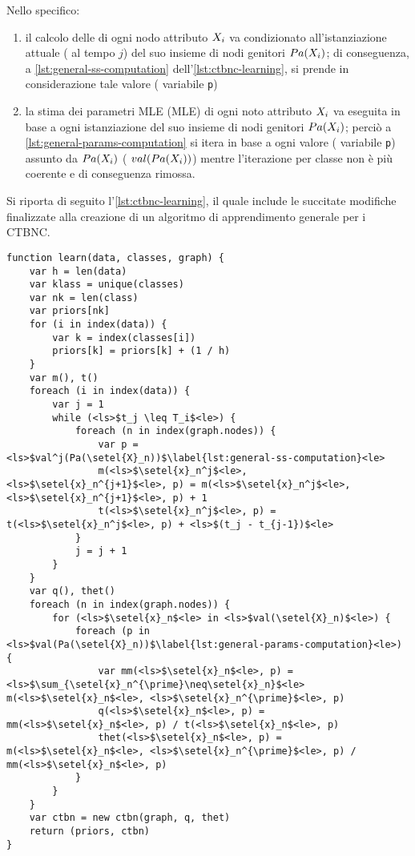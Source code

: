 Nello specifico:
\begin{enumerate}
    \item il calcolo delle \stats{} di ogni nodo attributo $\mathnormal{X}_i$ va condizionato all'istanziazione attuale (\ie{} al tempo $j$) del suo insieme di nodi genitori $Pa(\mathnormal{X}_i)$; di conseguenza, a \autoref{lst:general-ss-computation} dell'\autoref{lst:ctbnc-learning}, si prende in considerazione tale valore (\ie{} variabile \lstinline[]|p|)
    \item la stima dei parametri \acl{MLE} (\acs{MLE}) di ogni noto attributo $\mathnormal{X}_i$ va eseguita in base a ogni istanziazione del suo insieme di nodi genitori $Pa(\mathnormal{X}_i)$; perciò a \autoref{lst:general-params-computation} si itera in base a ogni valore (\ie{} variabile \lstinline[]|p|) assunto da $Pa(\mathnormal{X}_i)$ (\ie{} $val(Pa(\mathnormal{X}_i))$) mentre l'iterazione per classe non è più coerente e di conseguenza rimossa.
\end{enumerate}
Si riporta di seguito l'\autoref{lst:ctbnc-learning}, il quale include le succitate modifiche finalizzate alla creazione di un algoritmo di apprendimento generale per i \acs{CTBNC}.
\vspace*{8pt}\begin{lstlisting}[caption={[Apprendimento di un classificatore \acs{CTBN}]Apprendimento di un classificatore \acs{CTBN} (\acs{CTBNC}).}, label=lst:ctbnc-learning, language=pseudo]
function learn(data, classes, graph) {
    var h = len(data)
    var klass = unique(classes)
    var nk = len(class)
    var priors[nk]
    for (i in index(data)) {
        var k = index(classes[i])
        priors[k] = priors[k] + (1 / h)
    }
    var m(), t()
    foreach (i in index(data)) {
        var j = 1
        while (<ls>$t_j \leq T_i$<le>) {
            foreach (n in index(graph.nodes)) {
                var p = <ls>$val^j(Pa(\setel{X}_n))$\label{lst:general-ss-computation}<le>
                m(<ls>$\setel{x}_n^j$<le>, <ls>$\setel{x}_n^{j+1}$<le>, p) = m(<ls>$\setel{x}_n^j$<le>, <ls>$\setel{x}_n^{j+1}$<le>, p) + 1
                t(<ls>$\setel{x}_n^j$<le>, p) = t(<ls>$\setel{x}_n^j$<le>, p) + <ls>$(t_j - t_{j-1})$<le>
            }
            j = j + 1
        }
    }
    var q(), thet()
    foreach (n in index(graph.nodes)) {
        for (<ls>$\setel{x}_n$<le> in <ls>$val(\setel{X}_n)$<le>) {
            foreach (p in <ls>$val(Pa(\setel{X}_n))$\label{lst:general-params-computation}<le>) {
                var mm(<ls>$\setel{x}_n$<le>, p) = <ls>$\sum_{\setel{x}_n^{\prime}\neq\setel{x}_n}$<le> m(<ls>$\setel{x}_n$<le>, <ls>$\setel{x}_n^{\prime}$<le>, p)
                q(<ls>$\setel{x}_n$<le>, p) = mm(<ls>$\setel{x}_n$<le>, p) / t(<ls>$\setel{x}_n$<le>, p)
                thet(<ls>$\setel{x}_n$<le>, p) = m(<ls>$\setel{x}_n$<le>, <ls>$\setel{x}_n^{\prime}$<le>, p) / mm(<ls>$\setel{x}_n$<le>, p)
            }
        }
    }
    var ctbn = new ctbn(graph, q, thet)
    return (priors, ctbn)
}
\end{lstlisting}


